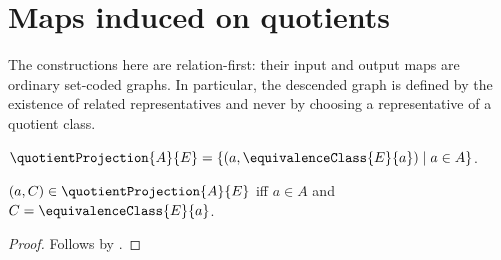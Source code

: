 



\section{Maps induced on quotients}

The constructions here are relation-first: their input and output maps are
ordinary set-coded graphs.  In particular, the descended graph is defined by
the existence of related representatives and never by choosing a
representative of a quotient class.

\begin{definition}\label{quotient_projection}
    $\quotientProjection{A}{E}=
        \{(a,\equivalenceClass{E}{a})\mid a\in A\}$.
\end{definition}

\begin{proposition}\label{quotient_projection_iff}
    $(a,C)\in\quotientProjection{A}{E}$ iff
        $a\in A$ and $C=\equivalenceClass{E}{a}$.
\end{proposition}
\begin{proof}
    Follows by .
\end{proof}

